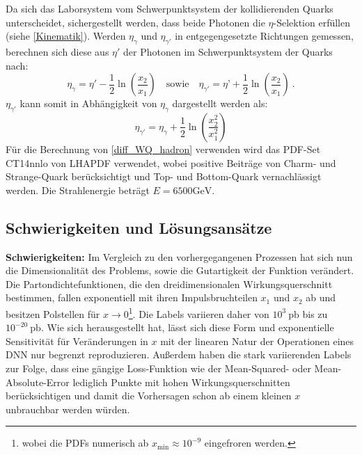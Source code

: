 Da sich das Laborsystem vom Schwerpunktsystem der kollidierenden Quarks unterscheidet, sichergestellt werden, dass beide Photonen die $\eta$-Selektion erfüllen (siehe \textsf{\autoref{Kinematik}}). Werden $\eta_{\gamma}$ und $\eta_{\gamma'}$ in entgegengesetzte Richtungen gemessen, berechnen sich diese aus $\eta'$ der Photonen im Schwerpunktsystem der Quarks nach: 
\begin{equation}
\eta_{\gamma} = \eta' -\frac{1}{2}\ln(\frac{x_2}{x_1}) \quad \text{sowie} \quad \eta_{\gamma'} = \eta’ + \frac{1}{2}\ln(\frac{x_2}{x_1})~.
\end{equation}
$\eta_{\gamma'}$ kann somit in Abhängigkeit von $\eta_{\gamma}$ dargestellt werden als:
\begin{equation} 
\eta_{\gamma'} = \eta_{\gamma} + \frac{1}{2}  \ln(\frac{x_2^2}{x_1^2})
\end{equation}
Für die Berechnung von \textsf{\autoref{diff_WQ_hadron}} verwenden wird das PDF-Set CT14nnlo von LHAPDF\cite{LHAPDF} verwendet, wobei positive Beiträge von Charm- und Strange-Quark berücksichtigt und Top- und Bottom-Quark vernachlässigt werden. Die Strahlenergie beträgt $E = 6500 \text{GeV}$.
\subsection{Schwierigkeiten und Lösungsansätze}
\textbf{Schwierigkeiten:}
Im Vergleich zu den vorhergegangenen Prozessen hat sich nun die Dimensionalität des Problems, sowie die Gutartigkeit der Funktion verändert. Die Partondichtefunktionen, die den dreidimensionalen Wirkungsquerschnitt bestimmen, fallen exponentiell mit ihren Impulsbruchteilen $x_1$ und $x_2$ ab und besitzen Polstellen für $x \rightarrow 0$\footnote{wobei die PDFs numerisch ab $x_{\text{min}} \approx 10^{-9}$ eingefroren werden.}. Die Labels variieren daher von $10^{3}~\text{pb}$ bis zu $10^{-20}~\text{pb}$. Wie sich herausgestellt hat, lässt sich diese Form und exponentielle Sensitivität für Veränderungen in $x$ mit der linearen Natur der Operationen eines DNN nur begrenzt reproduzieren.
Außerdem haben die stark variierenden Labels zur Folge, dass eine gängige Loss-Funktion wie der Mean-Squared- oder Mean-Absolute-Error lediglich Punkte mit hohen Wirkungsquerschnitten berücksichtigen und damit die Vorhersagen schon ab einem kleinen $x$ unbrauchbar werden würden. 

